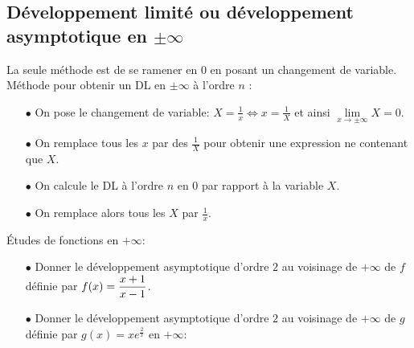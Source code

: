 \documentclass[a4paper, 11pt]{article}
\begin{document}
{%
\subsection{D\'eveloppement limit\'e ou d\'eveloppement asymptotique en $\pm\infty$}\begin{dboxminipage}{0.9 \textwidth}

\noindent La seule m\'ethode est de se ramener en 0 en posant un changement de variable.\\
\noindent M\'ethode pour obtenir un DL en $\pm \infty$ \`a l'ordre $n$ :\\

\begin{itemize}
\item[$\bullet$] On pose le changement de variable: $X=\frac{1}{x}\Leftrightarrow x=\frac{1}{X}$ et ainsi $\lim\limits_{x\to \pm \infty} X=0$.
\item[$\bullet$] On remplace tous les $x$ par des $\frac{1}{X}$ pour obtenir une expression ne contenant que $X$.
\item[$\bullet$] On calcule le DL \`a l'ordre $n$ en 0 par rapport \`a la variable $X$.
\item[$\bullet$] On remplace alors tous les $X$ par $\frac{1}{x}$.
\end{itemize}

\end{dboxminipage}


{\footnotesize \begin{exercice} \'Etudes de fonctions en $+\infty$: 
\begin{itemize}
\item[$\bullet$] Donner le d\'eveloppement asymptotique d'ordre $2$ au voisinage de $+\infty$ de $f$ d\'efinie par $f(x)=\displaystyle\frac{x+1}{x-1}$.
\item[$\bullet$] Donner le d\'eveloppement asymptotique d'ordre $2$ au voisinage de $+\infty$ de $g$ d\'efinie par $g(x)=xe^{\frac{2}{x}}$ en $+\infty$:
\end{itemize}
\end{exercice}
}


}
\end{document}
